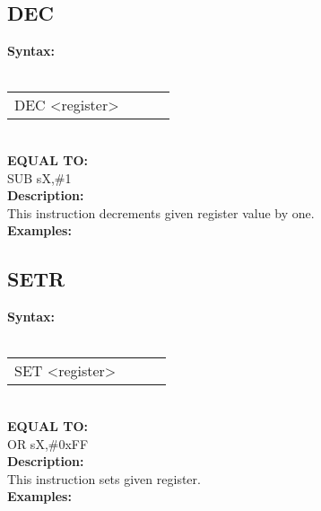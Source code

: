                 \subsection{DEC}
                \textbf{Syntax:}\\
                \\ {
                    \texttt{}
                    \begin{tabular}[h!]{llll}
                            { \color{highlight_instruction} DEC    } { \color{highlight_symbol} <register> }
                            { \color{highlight_comment}  }\\
                    \end{tabular}
                    }\\
                    \textbf{EQUAL TO:}\\
                    { \color{highlight_instruction} SUB    } { \color{highlight_symbol}      sX,\#1 }
                    \\
                \textbf{Description:}\\
                This instruction decrements given register value by one.\\
                \textbf{Examples:}\\
                        \begin{code}[h!]
                            symbol}\verb'DEC          s0' }\\
                        \end{code}


                \subsection{SETR}
                \textbf{Syntax:}\\
                \\ {
                    \texttt{}
                    \begin{tabular}[h!]{llll}
                            { \color{highlight_instruction} SET    } { \color{highlight_symbol} <register> }
                            { \color{highlight_comment}  }\\
                    \end{tabular}
                    }\\
                    \textbf{EQUAL TO:}\\
                    { \color{highlight_instruction} OR    } { \color{highlight_symbol}      sX,\#0xFF }
                    \\
                \textbf{Description:}\\
                This instruction sets given register.\\
                \textbf{Examples:}\\
                        \begin{code}[h!]
                            symbol}\verb'SET          s0' }\\
                        \end{code}

